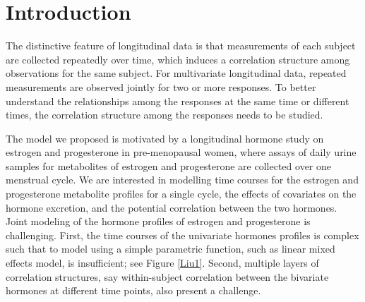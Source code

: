 \documentclass[review]{elsarticle}
\begin{document}
\linenumbers

%
%
%
\section{Introduction}

The distinctive feature of longitudinal data is that measurements of each subject are collected repeatedly over time, which induces a correlation structure among observations for the same subject. 
For multivariate longitudinal data, repeated measurements are observed jointly for two or more responses. To better understand the relationships among the responses at the same time or different times, the correlation structure among the responses needs to be studied. 


The model we proposed is motivated by a longitudinal hormone study on estrogen and progesterone in pre-menopausal women, where assays of daily urine samples for metabolites of estrogen and progesterone are collected over one menstrual cycle. 
We are interested in modelling  time courses for the estrogen and progesterone metabolite profiles for a single cycle, the effects of covariates on the hormone excretion, and the potential correlation between the two hormones.  
Joint modeling of the hormone profiles of estrogen and progesterone is challenging.
First, the time courses of the univariate hormones profiles is complex such that
to model using a simple parametric function, such as linear mixed effects model, is insufficient; see Figure \ref{Liu1}. 
Second, multiple layers of correlation structures, say within-subject correlation between the bivariate hormones at different time points, also present a challenge.
\end{document}
